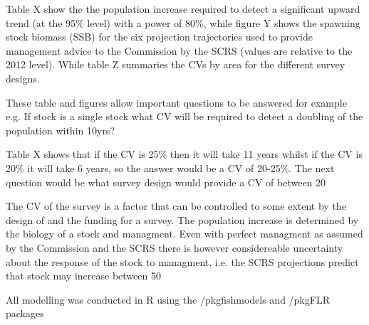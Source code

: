 \documentclass[preprint,authoryear,12pt]{elsarticle}
\begin{document}
Table X show the the population increase required to detect a significant upward trend (at the 95\% level) with a power of 80\%, while figure Y shows the spawning stock biomass (SSB) for the six projection trajectories used to provide management advice to the Commission by the SCRS (values are relative to the 2012 level). While table Z summaries the CVs by area for the different survey designs.

These table and figures allow important questions to be answered for example e.g.
If stock is a single stock what CV will be required to detect a doubling of the population within 10yrs?

Table X shows that if the CV is 25\% then it will take 11 years whilst if the CV is 20\% it will take 6 years, so the answer would be a CV of 20-25\%. The next question would be what survey design would provide a CV of between 20%

The CV of the survey is a factor that can be controlled to some extent by the design of and the funding for a survey. The population increase is determined by the biology of a stock and managment. Even with perfect managment as assumed by the Commission and the SCRS there is however considereable uncertainty about the response of the stock to managment, i.e. the SCRS projections predict that stock may increase between 50%


All modelling was conducted in R using the /pkg{fishmodels} and /pkg{FLR} packages
\end{document}
